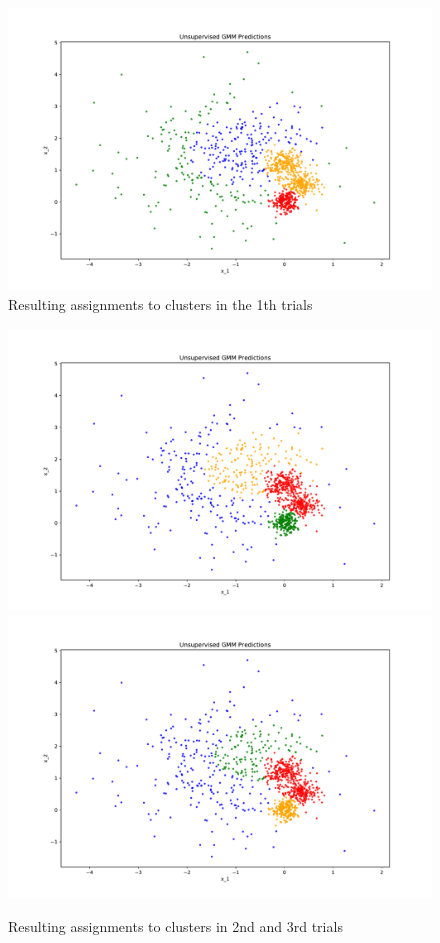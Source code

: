 \begin{answer}
\begin{figure}[htbp] 
	\centering
	\includegraphics[scale=0.5]{tex/04-semi_supervised_em/p03_pred_0.pdf}
	\caption{Resulting assignments to clusters in the 1th trials}
\end{figure}
\begin{figure}[htbp] 
	\centering
	\includegraphics[scale=0.5]{tex/04-semi_supervised_em/p03_pred_1.pdf}
	\includegraphics[scale=0.5]{tex/04-semi_supervised_em/p03_pred_2.pdf}
	\caption{Resulting assignments to clusters in 2nd and 3rd trials}
\end{figure}
\end{answer}
